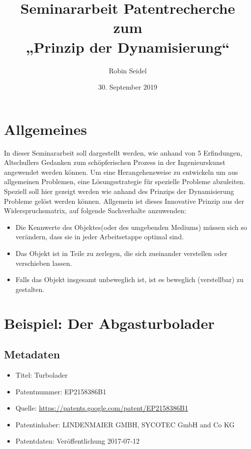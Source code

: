 \documentclass[11pt,a4paper]{article}
\title{Seminararbeit Patentrecherche zum\\ „Prinzip der Dynamisierung“}
\author{Robin Seidel}
\date{30. September 2019}
\begin{document}
\maketitle

\section{Allgemeines}
In dieser Seminararbeit soll dargestellt werden, wie anhand von 5 Erfindungen,
Altschullers Gedanken zum schöpferischen Prozess in der Ingenieurskunst
angewendet werden können. Um eine Herangehensweise zu entwickeln um aus
allgemeinen Problemen, eine Lösungsstrategie für spezielle Probleme
abzuleiten.  Speziell soll hier gezeigt werden wie anhand des Prinzips der
Dynamisierung Probleme gelöst werden können. Allgemein ist dieses Innovative
Prinzip aus der Widerspruchsmatrix, auf folgende Sachverhalte anzuwenden:
\begin{itemize}
\item
Die Kennwerte des Objektes(oder des umgebenden Mediums) müssen sich so
verändern, dass sie in jeder Arbeitsetappe optimal sind.
\item
Das Objekt ist in Teile zu zerlegen, die sich zueinander verstellen oder
verschieben lassen.
\item 
Falls das Objekt insgesamt unbeweglich ist, ist es beweglich (verstellbar) zu
gestalten.
\end{itemize}

\section{Beispiel: Der Abgasturbolader}

\subsection{Metadaten}
\begin{itemize}\itemsep0pt
\item Titel: Turbolader
\item Patentnummer: EP2158386B1
\item Quelle: \url{https://patents.google.com/patent/EP2158386B1}
\item Patentinhaber: LINDENMAIER GMBH, SYCOTEC GmbH and Co KG
\item Patentdaten: Veröffentlichung 2017-07-12
\end{itemize}
\end{document}
